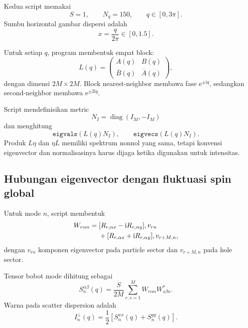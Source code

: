\documentclass[11pt,a4paper]{article}
\newcommand{\ii}{\mathrm{i}}
\newcommand{\ee}{\mathrm{e}}
\begin{document}
Kedua script memakai
\begin{equation}
S=1,
\qquad
N_q=150,
\qquad
q\in[0,3\pi].
\end{equation}
Sumbu horizontal gambar dispersi adalah
\begin{equation}
x=\frac{q}{2\pi}\in[0,1.5].
\end{equation}

Untuk setiap $q$, program membentuk empat block:
\begin{equation}
L(q)=
\begin{pmatrix}
A(q)&B(q)\\
\overline B(q)&\overline A(q)
\end{pmatrix},
\end{equation}
dengan dimensi $2M\times2M$. Block nearest-neighbor membawa fase $\ee^{\pm\ii q}$, sedangkan second-neighbor membawa $\ee^{\pm2\ii q}$.

Script mendefinisikan metric
\begin{equation}
N_I=\operatorname{diag}(I_M,-I_M)
\end{equation}
dan menghitung
\begin{equation}
\texttt{eigvals}(L(q)N_I),
\qquad
\texttt{eigvecs}(L(q)N_I).
\label{eq:codeeig}
\end{equation}
Produk $L\eta$ dan $\eta L$ memiliki spektrum nonnol yang sama, tetapi konvensi eigenvector dan normalisasinya harus dijaga ketika digunakan untuk intensitas.

\subsection{Hubungan eigenvector dengan fluktuasi spin global}

Untuk mode $n$, script membentuk
\begin{align}
W_{r\alpha n}={}&
[R_{r,\alpha x}-\ii R_{r,\alpha y}],v_{rn}\notag\\
&+[R_{r,\alpha x}+\ii R_{r,\alpha y}],v_{r+M,n},
\label{eq:W}
\end{align}
dengan $v_{rn}$ komponen eigenvector pada particle sector dan $v_{r+M,n}$ pada hole sector.

Tensor bobot mode dihitung sebagai
\begin{equation}
\boxed{
S_n^{\alpha\beta}(q)
=\frac{S}{2M}
\sum_{r,s=1}^{M}
W_{r\alpha n}
W_{s\beta n}^*.}
\label{eq:Sab-code}
\end{equation}
Warna pada scatter dispersion adalah
\begin{equation}
I_n^{\perp}(q)
=\frac12
\left[S_n^{xx}(q)+S_n^{yy}(q)\right].
\label{eq:scatter-weight}
\end{equation}
\end{document}

